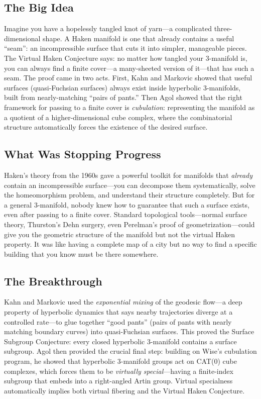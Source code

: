 \subsection{The Big Idea}
Imagine you have a hopelessly tangled knot of yarn---a complicated three-dimensional shape. A Haken manifold is one that already contains a useful ``seam'': an incompressible surface that cuts it into simpler, manageable pieces. The Virtual Haken Conjecture says: no matter how tangled your 3-manifold is, you can always find a finite cover---a many-sheeted version of it---that has such a seam. The proof came in two acts. First, Kahn and Markovic showed that useful surfaces (quasi-Fuchsian surfaces) always exist inside hyperbolic 3-manifolds, built from nearly-matching ``pairs of pants.'' Then Agol showed that the right framework for passing to a finite cover is \emph{cubulation}: representing the manifold as a quotient of a higher-dimensional cube complex, where the combinatorial structure automatically forces the existence of the desired surface.

\subsection{What Was Stopping Progress}
Haken's theory from the 1960s gave a powerful toolkit for manifolds that \emph{already} contain an incompressible surface---you can decompose them systematically, solve the homeomorphism problem, and understand their structure completely. But for a general 3-manifold, nobody knew how to guarantee that such a surface exists, even after passing to a finite cover. Standard topological tools---normal surface theory, Thurston's Dehn surgery, even Perelman's proof of geometrization---could give you the geometric structure of the manifold but not the virtual Haken property. It was like having a complete map of a city but no way to find a specific building that you know must be there somewhere.

\subsection{The Breakthrough}
Kahn and Markovic used the \emph{exponential mixing} of the geodesic flow---a deep property of hyperbolic dynamics that says nearby trajectories diverge at a controlled rate---to glue together ``good pants'' (pairs of pants with nearly matching boundary curves) into quasi-Fuchsian surfaces. This proved the Surface Subgroup Conjecture: every closed hyperbolic 3-manifold contains a surface subgroup. Agol then provided the crucial final step: building on Wise's cubulation program, he showed that hyperbolic 3-manifold groups act on CAT(0) cube complexes, which forces them to be \emph{virtually special}---having a finite-index subgroup that embeds into a right-angled Artin group. Virtual specialness automatically implies both virtual fibering and the Virtual Haken Conjecture.

